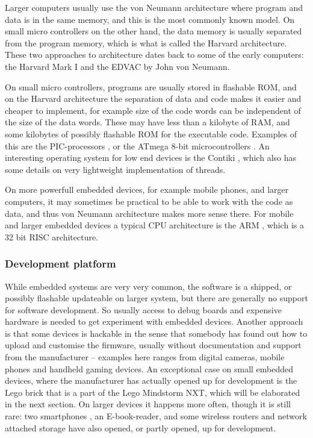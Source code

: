 \documentclass[11pt]{report}
\begin{document}
Larger computers usually use the von Neumann architecture where program and data is in the same memory, and this is the most commonly known model.
On small micro controllers on the other hand, the data memory is usually separated from the program memory, which is what is called the Harvard architecture. 
These two approaches to architecture dates back to some of the early computers: the Harvard Mark I \cite{harvard-mark1} and the EDVAC \cite{edvac} by John von Neumann.

On small micro controllers, programs are usually stored in flashable ROM, and on the Harvard architecture the separation of data and code makes it easier and cheaper to implement, for example size of the code words can be independent of the size of the data words.
These may have less than a kilobyte of RAM, and some kilobytes of possibly flashable ROM for the executable code. Examples of this are the PIC-processors \cite{picspec}, or the ATmega 8-bit microcontrollers \cite{atmegaspec}.
An interesting operating system for low end devices is the Contiki \cite{contiki}, which also has some details on very lightweight implementation of threads.

On more powerfull embedded devices, for example mobile phones, and larger computers,
it may sometimes be practical to be able to work with the code as data, and thus von Neumann architecture makes more sense there.
For mobile and larger embedded devices a typical CPU architecture is the ARM \cite{arm-architecture}, which is a 32 bit RISC architecture.

\subsubsection{Development platform}

While embedded systems are very very common, the software is a shipped, or possibly flashable updateable on larger system, but there are generally no support for software development.
So usually access to debug boards and expensive hardware is needed to get experiment with embedded devices.
Another approach is that some devices is hackable in the sense that somebody has found out how to upload and customise the firmware, usually without documentation and support from the manufacturer -- examples here ranges from digital cameras, mobile phones and handheld gaming devices.
An exceptional case on small embedded devices, where the manufacturer has actually opened up for development is the Lego brick that is a part of the Lego Mindstorm NXT, which will be elaborated in the next section.
On larger devices it happens more often, though it is still rare: two smartphones \cite{openmoko, htc-android}, an E-book-reader, and some wireless routers and network attached storage \cite{wrtg, nslu, buffalo} have also opened, or partly opened, up for development.
\end{document}

